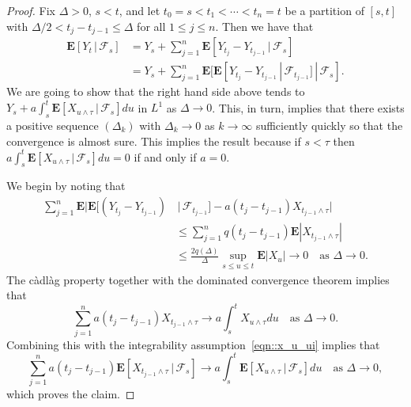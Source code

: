 \documentclass[JEP,XML,SOM,Unicode]{cedram}
\let\mathcal\mathscr
\theoremstyle{plain}
\numberwithin{theorem}{section}
\theoremstyle{definition}
\newcommand{\CF}{{\mathcal F}}
\newcommand \E {{\mathbf E}}
\newcommand{\cadlag}{càdlàg}
\newcommand{\giv}{\,|\,}
\begin{document}
\begin{proof}
Fix $\Delta > 0$, $s < t$, and let $t_0 = s < t_1 < \cdots < t_n = t$ be a partition of $[s,t]$ with $\Delta/2 < t_j-t_{j-1} \leq \Delta$ for all $1 \leq j \leq n$. Then we have that\vspace*{-4pt}
\begin{align*}
\E[ Y_t \giv \CF_s ]
&= Y_s + \sum_{j=1}^n \E[ Y_{t_j} - Y_{t_{j-1}} \giv \CF_s]\\[-3pt]
&= Y_s + \sum_{j=1}^n \E[ \E[ Y_{t_j} - Y_{t_{j-1}} \giv \CF_{t_{j-1}}] \giv \CF_s].
\end{align*}
We are going to show that the right hand side above tends to $Y_s + a \int_s^t \E[ X_{u \wedge \tau} \giv \CF_s] du$ in $L^1$ as $\Delta \to 0$. This, in turn, implies that there exists a positive sequence $(\Delta_k)$ with $\Delta_k \to 0$ as $k \to \infty$ sufficiently quickly so that the convergence is almost sure. This implies the result because if $s < \tau$ then $a \int_s^t \E[ X_{u \wedge \tau} \giv \CF_s] du =0$ if and only if $a =0$.

We begin by noting that
\begin{align*}
\sum_{j=1}^n \E\bigl| \E[ (Y_{t_j} - Y_{t_{j-1}}) &\giv \CF_{t_{j-1}}] - a(t_j-t_{j-1}) X_{t_{j-1} \wedge \tau} \bigr|\\[
-10pt]
&\leq \sum_{j=1}^n q(t_j-t_{j-1}) \E|X_{t_{j-1} \wedge \tau}|\\
&\leq \frac{2q(\Delta)}{\Delta} \sup_{s \leq u \leq t} \E|X_u| \to 0 \quad\text{as $\textstyle \Delta \to 0$}.
\end{align*}
The {\cadlag} property together with the dominated convergence theorem implies that
\begin{equation*}
\sum_{j=1}^n a(t_j-t_{j-1}) X_{t_{j-1} \wedge \tau} \to a \int_s^t X_{u \wedge \tau} du \quad\text{as $\textstyle \Delta \to 0$}.
\end{equation*}
Combining this with the integrability assumption~\eqref{eqn::x_u_ui} implies that
\begin{equation*}
\sum_{j=1}^n a(t_j-t_{j-1}) \E[ X_{t_{j-1} \wedge \tau} \giv \CF_s] \to a \int_s^t \E[ X_{u \wedge \tau} \giv \CF_s] du \quad\text{as $\textstyle \Delta \to 0$},
\end{equation*}
which proves the claim.
\end{proof}
\end{document}
